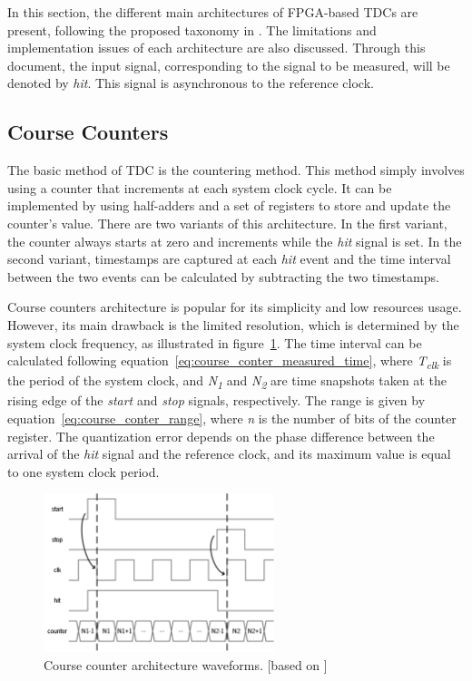 
In this section, the different main architectures of \gls{FPGA}-based \glspl{TDC} are present, following the proposed taxonomy in \citep{machado_ov}. The limitations and implementation issues of each architecture are also discussed. Through this document, the input signal, corresponding to the signal to be measured, will be denoted by \textit{hit}. This signal is asynchronous to the reference clock.

\subsection{Course Counters} %
\label{sub:course_counters}

The basic method of \gls{TDC} is the countering method. This method simply involves using a counter that increments at each system clock cycle. It can be implemented by using half-adders and a set of registers to store and update the counter's value. There are two variants of this architecture. In the first variant, the counter always starts at zero and increments while the \textit{hit} signal is set. In the second variant, timestamps are captured at each \textit{hit} event and the time interval between the two events can be calculated by subtracting the two timestamps.

Course counters architecture is popular for its simplicity and low resources usage. However, its main drawback is the limited resolution, which is determined by the system clock frequency, as illustrated in figure~\ref{fig:course_counter_wf}. The time interval can be calculated following equation~\ref{eq:course_conter_measured_time}, where \textit{T\textsubscript{clk}} is the period of the system clock, and \textit{N\textsubscript{1}} and \textit{N\textsubscript{2}} are time snapshots taken at the rising edge of the \textit{start} and \textit{stop} signals, respectively. The range is given by equation~\ref{eq:course_conter_range}, where \textit{n} is the number of bits of the counter register. The quantization error depends on the phase difference between the arrival of the \textit{hit} signal and the reference clock, and its maximum value is equal to one system clock period.

\begin{figure}[ht!]
	\centering
	\includegraphics[width=0.6\textwidth]{img/02_StateofArt/course_conter_td.png}
	\caption{Course counter architecture waveforms. [based on \citep{course_counter_td}]}
	\label{fig:course_counter_wf}
\end{figure}

